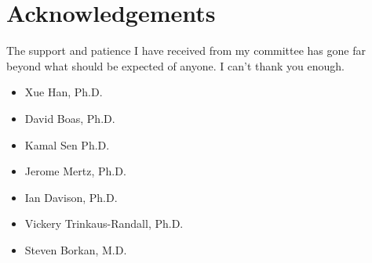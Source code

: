 \hypertarget{acknowledgements}{%
\chapter*{Acknowledgements}\label{acknowledgements}}

The support and patience I have received from my committee has gone far beyond what should be expected of anyone.
I can't thank you enough.
\begin{itemize}
	\item Xue Han, Ph.D.
	\item David Boas, Ph.D.
    \item Kamal Sen Ph.D.
	\item Jerome Mertz, Ph.D.
	\item Ian Davison, Ph.D.
	\item Vickery Trinkaus-Randall, Ph.D.
	\item Steven Borkan, M.D.
\end{itemize}

\vskip 1in
